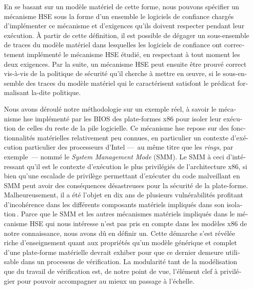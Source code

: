 \begin{otherlanguage}{french}
  En se basant sur un modèle matériel de cette forme, nous pouvons spécifier un
  mécanisme HSE sous la forme d’un ensemble le logiciels de confiance chargés
  d’implémenter ce mécanisme et d’exigences qu’ils doivent respecter pendant
  leur exécution.
  À partir de cette définition, il est possible de dégager un sous-ensemble de
  traces du modèle matériel dans lesquelles les logiciels de confiance ont
  correctement implémenté le mécanisme HSE étudié, en respectant à tout moment
  les deux exigences.
  Par la suite, un mécanisme HSE peut ensuite être prouvé correct vis-à-vis de
  la politique de sécurité qu’il cherche à mettre en œuvre, si le sous-ensemble
  des traces du modèle matériel qui le caractérisent satisfont le prédicat
  formalisant la-dite politique.

  Nous avons déroulé notre méthodologie sur un exemple réel, à savoir le
  mécanisme \ac{hse} implémenté par les BIOS des plate-formes x86 pour isoler
  leur exécution de celles du reste de la pile logicielle.
  Ce mécanisme \ac{hse} repose sur des fonctionnalités matérielles relativement
  peu connues, en particulier un contexte d’exécution particulier des
  processeurs d’Intel ---~au même titre que les \emph{rings}, par exemple~---
  nommé le \emph{System Management Mode} (SMM).
  Le SMM à ceci d’intéressant qu’il est le contexte d’exécution le plus
  privilégiés de l’architecture x86, si bien qu’une escalade de privilège
  permettant d’exécuter du code malveillant en SMM peut avoir des conséquences
  désastreuses pour la sécurité de la plate-forme.
  Malheureusement, il a été l’objet en dix ans de plusieurs vulnérabilités
  profitant d’incohérence dans les différents composants matériels impliqués
  dans son
  isolation\,\cite{duflot2009smram,wojtczuk2009smram,domas2015sinkhole}.
  Parce que le SMM et les autres mécanismes matériels impliqués dans le
  mécanisme HSE qui nous intéresse n’est pas pris en compte dans les modèles x86
  de notre connaissance, nous avons dû en définir un.
  Cette démarche s’est révélée riche d’enseignement quant aux propriétés qu’un
  modèle générique et complet d’une plate-forme matérielle devrait exhiber pour
  que ce dernier demeure utilisable dans un processus de vérification.
  La modularité tant de la modélisation que du travail de vérification est, de
  notre point de vue, l’élément clef à privilégier pour pouvoir accompagner au
  mieux un passage à l’échelle.


\end{otherlanguage}
